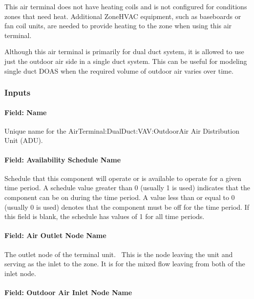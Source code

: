 This air terminal does not have heating coils and is not configured for conditions zones that need heat. Additional ZoneHVAC equipment, such as baseboards or fan coil units, are needed to provide heating to the zone when using this air terminal.

Although this air terminal is primarily for dual duct system, it is allowed to use just the outdoor air side in a single duct system. This can be useful for modeling single duct DOAS when the required volume of outdoor air varies over time.

\subsubsection{Inputs}\label{inputs-16-000}

\paragraph{Field: Name}\label{field-name-16}

Unique name for the AirTerminal:DualDuct:VAV:OutdoorAir Air Distribution Unit (ADU).

\paragraph{Field: Availability Schedule Name}\label{field-availability-schedule-name-13}

Schedule that this component will operate or is available to operate for a given time period. A schedule value greater than 0 (usually 1 is used) indicates that the component can be on during the time period. A value less than or equal to 0 (usually 0 is used) denotes that the component must be off for the time period. If this field is blank, the schedule has values of 1 for all time periods.

\paragraph{Field: Air Outlet Node Name}\label{field-air-outlet-node-name-9}

The outlet node of the terminal unit.~ This is the node leaving the unit and serving as the inlet to the zone. It is for the mixed flow leaving from both of the inlet node.

\paragraph{Field: Outdoor Air Inlet Node Name}\label{field-outdoor-air-inlet-node-name}

